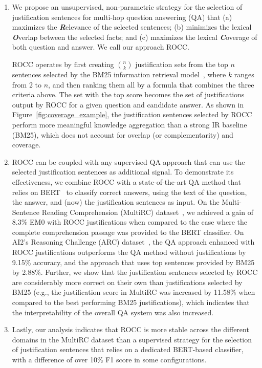 \begin{enumerate}[label={\bf(\arabic*)}, topsep=0.2em, itemsep=0.1em, wide, labelwidth=!, labelindent=0pt]
\item We propose an unsupervised, non-parametric strategy for the selection of justification sentences for multi-hop question answering (QA) that (a) maximizes the {\bf {\em R}}elevance of the selected sentences; (b) minimizes the lexical {\bf {\em O}}verlap between the selected facts; and (c) maximizes the lexical {\bf {\em C}}overage of both question and answer. We call our approach ROCC. 

ROCC operates by first creating $n \choose k$ justification sets from the top $n$ sentences selected by the BM25 information retrieval model~\cite{BM25}, where $k$ ranges from 2 to $n$, and then ranking them all by a formula that combines the three criteria above. The set with the top score becomes the set of justifications output by ROCC for a given question and candidate answer. As shown in Figure~\ref{fig:coverage_example}, 
 the justification sentences selected by ROCC perform more meaningful knowledge aggregation than a strong IR baseline (BM25), which does not account for overlap (or complementarity) and coverage. 

\item ROCC can be coupled with any supervised QA approach that can use the selected justification sentences as additional signal. To demonstrate its effectiveness, we combine ROCC with a state-of-the-art QA method that relies on BERT~\cite{devlin2018bert} to classify correct answers, using the text of the question, the answer, and (now) the justification sentences as input. On the Multi-Sentence Reading Comprehension (MultiRC) dataset~\cite{khashabi2018looking}, we achieved a gain of 8.3\% EM0 with ROCC justifications when compared to the case where the complete comprehension passage was provided to the BERT classifier. On AI2's Reasoning Challenge (ARC) dataset~\cite{clark2018think}, the QA approach enhanced with ROCC justifications outperforms the QA method without justifications by 9.15\% accuracy, and the approach that uses top sentences provided by BM25 by 2.88\%.  
Further, we show that the justification sentences selected by ROCC are considerably more correct on their own than justifications selected by BM25 (e.g., the justification score in MultiRC was increased by 11.58\% when compared to the best performing BM25 justifications), which indicates that the interpretability of the overall QA system was also increased. 

\item Lastly, our analysis indicates that ROCC is more stable across the different domains in the MultiRC dataset than a supervised strategy for the selection of justification sentences that relies on a dedicated BERT-based classifier, with a difference of over 10\% F1 score in some configurations. 
\end{enumerate}

